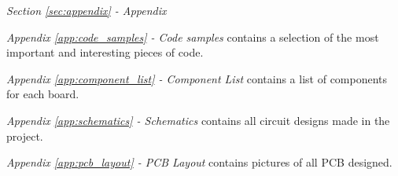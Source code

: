 \medskip
\emph{Section \ref{sec:appendix} - Appendix} 

\quad \textit{Appendix \ref{app:code_samples} - Code samples} contains a selection of the most important and interesting pieces of code.

\quad \textit{Appendix \ref{app:component_list} - Component List} contains a list of components for each board.

\quad \textit{Appendix \ref{app:schematics} - Schematics} contains all circuit designs made in the project.

\quad \textit{Appendix \ref{app:pcb_layout} - PCB Layout} contains pictures of all PCB designed. 

